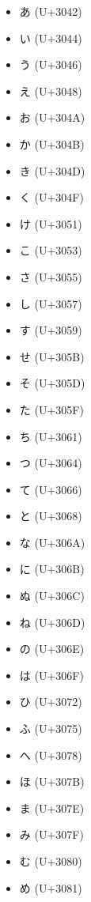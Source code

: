\documentclass[a4paper]{article}
\begin{document}
\begin{itemize}
    \item {\babelstone あ } (U+3042)
    \item {\babelstone い } (U+3044)
    \item {\babelstone う } (U+3046)
    \item {\babelstone え } (U+3048)
    \item {\babelstone お } (U+304A)
    \item {\babelstone か } (U+304B)
    \item {\babelstone き } (U+304D)
    \item {\babelstone く } (U+304F)
    \item {\babelstone け } (U+3051)
    \item {\babelstone こ } (U+3053)
    \item {\babelstone さ } (U+3055)
    \item {\babelstone し } (U+3057)
    \item {\babelstone す } (U+3059)
    \item {\babelstone せ } (U+305B)
    \item {\babelstone そ } (U+305D)
    \item {\babelstone た } (U+305F)
    \item {\babelstone ち } (U+3061)
    \item {\babelstone つ } (U+3064)
    \item {\babelstone て } (U+3066)
    \item {\babelstone と } (U+3068)
    \item {\babelstone な } (U+306A)
    \item {\babelstone に } (U+306B)
    \item {\babelstone ぬ } (U+306C)
    \item {\babelstone ね } (U+306D)
    \item {\babelstone の } (U+306E)
    \item {\babelstone は } (U+306F)
    \item {\babelstone ひ } (U+3072)
    \item {\babelstone ふ } (U+3075)
    \item {\babelstone へ } (U+3078)
    \item {\babelstone ほ } (U+307B)
    \item {\babelstone ま } (U+307E)
    \item {\babelstone み } (U+307F)
    \item {\babelstone む } (U+3080)
    \item {\babelstone め } (U+3081)

\end{itemize}
\end{document}
